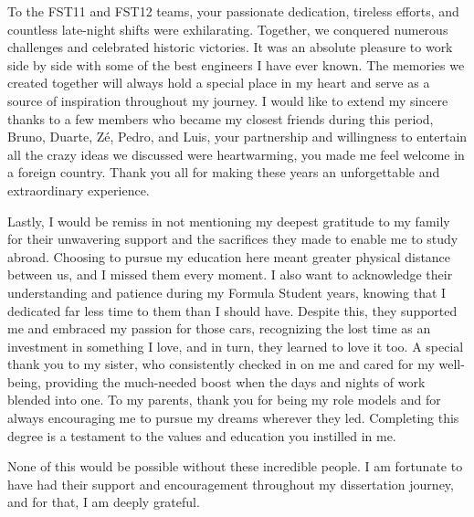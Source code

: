 To the FST11 and FST12 teams, your passionate dedication, tireless efforts, and countless late-night shifts were exhilarating. Together, we conquered numerous challenges and celebrated historic victories. It was an absolute pleasure to work side by side with some of the best engineers I have ever known. The memories we created together will always hold a special place in my heart and serve as a source of inspiration throughout my journey. I would like to extend my sincere thanks to a few members who became my closest friends during this period, Bruno, Duarte, Zé, Pedro, and Luis, your partnership and willingness to entertain all the crazy ideas we discussed were heartwarming, you made me feel welcome in a foreign country. Thank you all for making these years an unforgettable and extraordinary experience.

Lastly, I would be remiss in not mentioning my deepest gratitude to my family for their unwavering support and the sacrifices they made to enable me to study abroad. Choosing to pursue my education here meant greater physical distance between us, and I missed them every moment. I also want to acknowledge their understanding and patience during my Formula Student years, knowing that I dedicated far less time to them than I should have. Despite this, they supported me and embraced my passion for those cars, recognizing the lost time as an investment in something I love, and in turn, they learned to love it too. A special thank you to my sister, who consistently checked in on me and cared for my well-being, providing the much-needed boost when the days and nights of work blended into one. To my parents, thank you for being my role models and for always encouraging me to pursue my dreams wherever they led. Completing this degree is a testament to the values and education you instilled in me.

None of this would be possible without these incredible people. I am fortunate to have had their support and encouragement throughout my dissertation journey, and for that, I am deeply grateful.